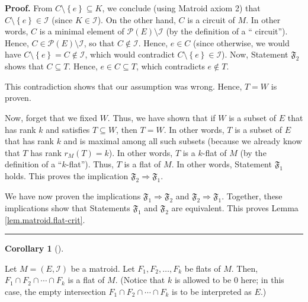 \documentclass[numbers=enddot,12pt,final,onecolumn,notitlepage]{scrartcl}%
\theoremstyle{definition}
\newtheorem{coro}[theo]{Corollary}
\newenvironment{corollary}[1][]
{\begin{coro}[#1]\begin{leftbar}}
{\end{leftbar}\end{coro}}
\newenvironment{proof}[1][Proof]{\noindent\textbf{#1.} }{\ \rule{0.5em}{0.5em}}
\begin{document}
\begin{proof}
From $C\setminus\left\{  e\right\}  \subseteq K$, we conclude (using Matroid
axiom 2) that $C\setminus\left\{  e\right\}  \in\mathcal{I}$ (since
$K\in\mathcal{I}$). On the other hand, $C$ is a circuit of $M$. In other
words, $C$ is a minimal element of $\mathcal{P}\left(  E\right)
\setminus\mathcal{I}$ (by the definition of a \textquotedblleft
circuit\textquotedblright). Hence, $C\in\mathcal{P}\left(  E\right)
\setminus\mathcal{I}$, so that $C\notin\mathcal{I}$. Hence, $e\in C$ (since
otherwise, we would have $C\setminus\left\{  e\right\}  =C\notin\mathcal{I}$,
which would contradict $C\setminus\left\{  e\right\}  \in\mathcal{I}$). Now,
Statement $\mathfrak{F}_{2}$ shows that $C\subseteq T$. Hence, $e\in
C\subseteq T$, which contradicts $e\notin T$.

This contradiction shows that our assumption was wrong. Hence, $T=W$ is proven.

Now, forget that we fixed $W$. Thus, we have shown that if $W$ is a subset of
$E$ that has rank $k$ and satisfies $T\subseteq W$, then $T=W$. In other
words, $T$ is a subset of $E$ that has rank $k$ and is maximal among all such
subsets (because we already know that $T$ has rank $r_{M}\left(  T\right)
=k$). In other words, $T$ is a $k$-flat of $M$ (by the definition of a
\textquotedblleft$k$-flat\textquotedblright). Thus, $T$ is a flat of $M$. In
other words, Statement $\mathfrak{F}_{1}$ holds. This proves the implication
$\mathfrak{F}_{2}\Longrightarrow\mathfrak{F}_{1}$.

We have now proven the implications $\mathfrak{F}_{1}\Longrightarrow
\mathfrak{F}_{2}$ and $\mathfrak{F}_{2}\Longrightarrow\mathfrak{F}_{1}$.
Together, these implications show that Statements $\mathfrak{F}_{1}$ and
$\mathfrak{F}_{2}$ are equivalent. This proves Lemma
\ref{lem.matroid.flat-crit}.
\end{proof}

\begin{corollary}
\label{cor.matroid.flat-cap}Let $M=\left(  E,\mathcal{I}\right)  $ be a
matroid. Let $F_{1},F_{2},\ldots,F_{k}$ be flats of $M$. Then, $F_{1}\cap
F_{2}\cap\cdots\cap F_{k}$ is a flat of $M$. (Notice that $k$ is allowed to be
$0$ here; in this case, the empty intersection $F_{1}\cap F_{2}\cap\cdots\cap
F_{k}$ is to be interpreted as $E$.)
\end{corollary}
\end{document}
